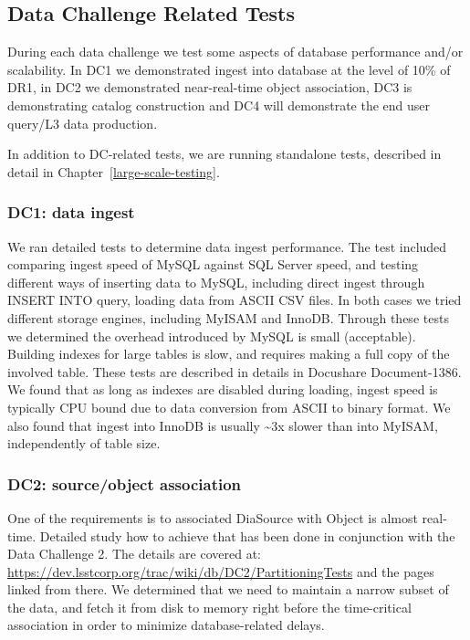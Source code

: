 \documentclass[DM,lsstdraft,toc]{lsstdoc}
\begin{document}
\subsection{Data Challenge Related
Tests}\label{data-challenge-related-tests}

During each data challenge we test some aspects of database performance
and/or scalability. In DC1 we demonstrated ingest into database at the
level of 10\% of DR1, in DC2 we demonstrated near-real-time object
association, DC3 is demonstrating catalog construction and DC4 will
demonstrate the end user query/L3 data production.

In addition to DC-related tests, we are running standalone tests,
described in detail in Chapter~\ref{large-scale-testing}.

\subsubsection{DC1: data ingest}\label{dc1-data-ingest}

We ran detailed tests to determine data ingest performance. The test
included comparing ingest speed of MySQL against SQL Server speed, and
testing different ways of inserting data to MySQL, including direct
ingest through INSERT INTO query, loading data from ASCII CSV files. In
both cases we tried different storage engines, including MyISAM and
InnoDB. Through these tests we determined the overhead introduced by
MySQL is small (acceptable). Building indexes for large tables is slow,
and requires making a full copy of the involved table. These tests are
described in details in Docushare Document-1386. We found that as long
as indexes are disabled during loading, ingest speed is typically CPU
bound due to data conversion from ASCII to binary format. We also found
that ingest into InnoDB is usually \textasciitilde{}3x slower than into
MyISAM, independently of table size.

\subsubsection{DC2: source/object
association}\label{dc2-sourceobject-association}

One of the requirements is to associated DiaSource with Object is almost
real-time. Detailed study how to achieve that has been done in
conjunction with the Data Challenge 2. The details are covered at:
\url{https://dev.lsstcorp.org/trac/wiki/db/DC2/PartitioningTests} and
the pages linked from there. We determined that we need to maintain a
narrow subset of the data, and fetch it from disk to memory right before
the time-critical association in order to minimize database-related
delays.
\end{document}
